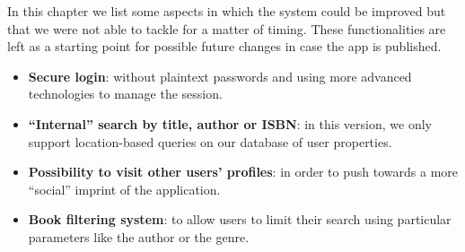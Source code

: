 In this chapter we list some aspects in which the system could be improved but that we were not able to tackle for a matter of timing.
These functionalities are left as a starting point for possible future changes in case the app is published.

\begin{itemize}
      \item \textbf{Secure login}: without plaintext passwords and using more advanced technologies to manage the session.
      \item \textbf{``Internal'' search by title, author or ISBN}: in this version, we only support location-based queries on our database of user properties.
      \item \textbf{Possibility to visit other users' profiles}: in order to push towards a more ``social'' imprint of the application.
      \item \textbf{Book filtering system}: to allow users to limit their search using particular parameters like the author or the genre.
\end{itemize}

